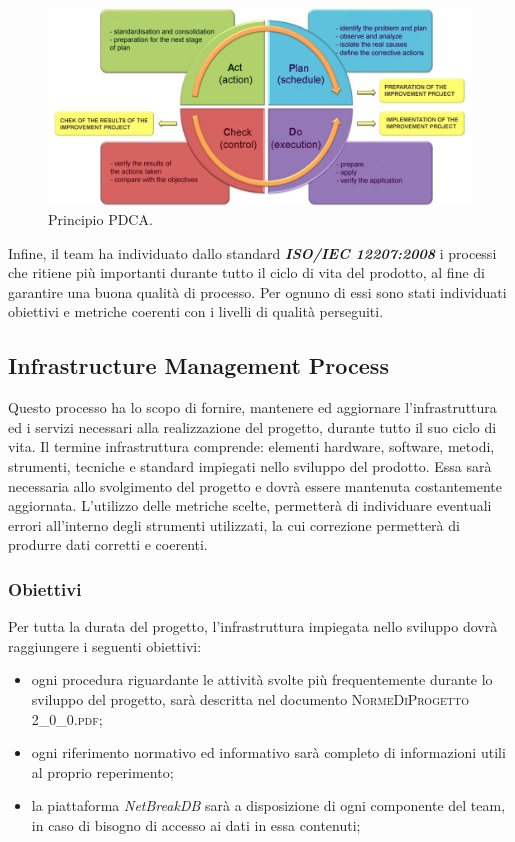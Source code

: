	\begin{figure}[H]
		\centering
		\includegraphics[scale=0.6]{includes/img/pdca.png}
		\caption{Principio PDCA.}
	\end{figure}

	Infine, il team ha individuato dallo standard \textbf{\textit{ISO/IEC 12207:2008}} i processi che ritiene più importanti durante tutto il ciclo di vita del prodotto, al fine di garantire una buona qualità di processo. Per ognuno di essi sono stati individuati obiettivi e metriche coerenti con i livelli di qualità perseguiti.
	
	\subsection{Infrastructure Management Process}
	Questo processo ha lo scopo di fornire, mantenere ed aggiornare l’infrastruttura ed i servizi necessari alla realizzazione del progetto, durante tutto il suo ciclo di vita. Il termine infrastruttura comprende: elementi hardware, software, metodi, strumenti, tecniche e standard impiegati nello sviluppo del prodotto.
	Essa sarà necessaria allo svolgimento del progetto e dovrà essere mantenuta costantemente aggiornata.
	L'utilizzo delle metriche scelte, permetterà di individuare eventuali errori all’interno degli strumenti utilizzati, la cui correzione permetterà di produrre dati corretti e coerenti.
		
		\subsubsection{Obiettivi}
		Per tutta la durata del progetto, l’infrastruttura impiegata nello sviluppo dovrà raggiungere i seguenti obiettivi:
		\begin{itemize}
			\item ogni procedura riguardante le attività svolte più frequentemente durante lo sviluppo del
			progetto, sarà descritta nel documento \textsc{NormeDiProgetto 2\_0\_0.pdf};
			\item ogni riferimento normativo ed informativo sarà completo di informazioni utili al proprio
			reperimento;
			\item la piattaforma \textit{NetBreakDB} sarà a disposizione di ogni componente del team, in caso di bisogno di accesso ai dati in essa contenuti;
		\end{itemize}
